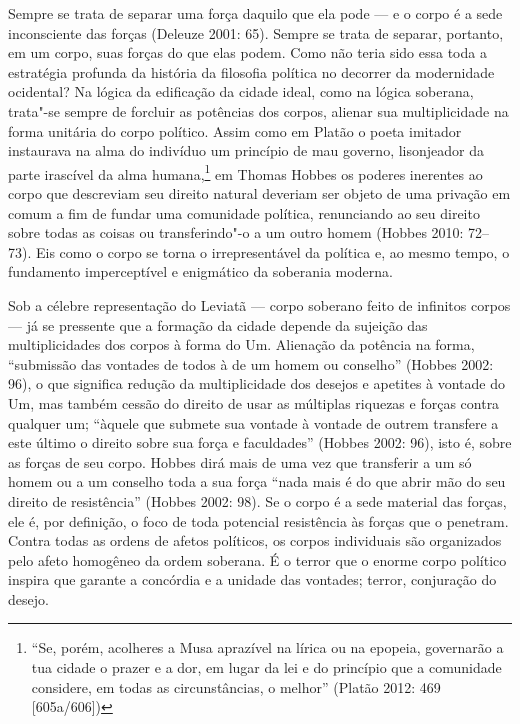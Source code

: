 Sempre se trata de separar uma força daquilo que ela pode --- e o corpo é
a sede inconsciente das forças (Deleuze 2001: 65). Sempre se trata de
separar, portanto, em um corpo, suas forças do que elas podem. Como não
teria sido essa toda a estratégia profunda da história da filosofia
política no decorrer da modernidade ocidental? Na lógica da edificação
da cidade ideal, como na lógica soberana, trata"-se sempre de forcluir as
potências dos corpos, alienar sua multiplicidade na forma unitária do
corpo político. Assim como em Platão o poeta imitador instaurava na alma
do indivíduo um princípio de mau governo, lisonjeador da parte irascível
da alma humana,\footnote{``Se, porém, acolheres a Musa
  aprazível na lírica ou na epopeia, governarão a tua cidade o prazer e
  a dor, em lugar da lei e do princípio que a comunidade considere, em
  todas as circunstâncias, o melhor'' (Platão 2012: 469 {[}605a/606{]})}
em Thomas Hobbes os poderes inerentes ao corpo que descreviam seu
direito natural deveriam ser objeto de uma privação em comum a fim de
fundar uma comunidade política, renunciando ao seu direito sobre todas
as coisas ou transferindo"-o a um outro homem (Hobbes 2010: 72--73). Eis
como o corpo se torna o irrepresentável da política e, ao mesmo tempo, o
fundamento imperceptível e enigmático da soberania moderna.

Sob a célebre representação do Leviatã --- corpo soberano feito de
infinitos corpos --- já se pressente que a formação da cidade depende da
sujeição das multiplicidades dos corpos à forma do Um. Alienação da
potência na forma, ``submissão das vontades de todos à de um homem ou
conselho'' (Hobbes 2002: 96), o que significa redução da multiplicidade
dos desejos e apetites à vontade do Um, mas também cessão do direito de
usar as múltiplas riquezas e forças contra qualquer um; ``àquele que
submete sua vontade à vontade de outrem transfere a este último o
direito sobre sua força e faculdades'' (Hobbes 2002: 96), isto é, sobre
as forças de seu corpo. Hobbes dirá mais de uma vez que transferir a um
só homem ou a um conselho toda a sua força ``nada mais é do que abrir
mão do seu direito de resistência'' (Hobbes 2002: 98). Se o corpo é a
sede material das forças, ele é, por definição, o foco de toda potencial
resistência às forças que o penetram. Contra todas as ordens de afetos
políticos, os corpos individuais são organizados pelo afeto homogêneo da
ordem soberana. É o terror que o enorme corpo político inspira que
garante a concórdia e a unidade das vontades; terror, conjuração do
desejo.

